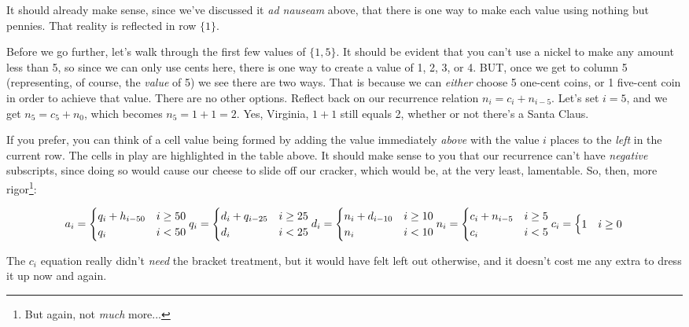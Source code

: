\vspace{2em}
It should already make sense, since we've discussed it \textit{ad nauseam} above, that there is one way to make each value using nothing but pennies.  That reality is reflected in row $\{1\}$.

Before we go further, let's walk through the first few values of $\{1,5\}$.  It should be evident that you can't use a nickel to make any amount less than 5\textcent, so since we can only use cents here, there is one way to create a value of 1\textcent, 2\textcent, 3\textcent, or 4\textcent.  BUT, once we get to column 5 (representing, of course, the \textit{value} of 5) we see there are two ways.  That is because we can \textit{either} choose 5 one-cent coins, or 1 five-cent coin in order to achieve that value.  There are no other options.  Reflect back on our recurrence relation $n_i = c_i + n_{i-5}$.  Let's set $i = 5$, and we get $n_5 = c_5 + n_0$, which becomes $n_5 = 1 + 1 = 2$.  Yes, Virginia, $1+1$ still equals 2, whether or not there's a Santa Claus.

If you prefer, you can think of a cell value being formed by adding the value immediately \textit{above} with the value $i$ places to the \textit{left} in the current row.  The cells in play are highlighted in the table above. It should make sense to you that our recurrence can't have \textit{negative} subscripts, since doing so would cause our cheese to slide off our cracker, which would be, at the very least, lamentable.  So, then, more rigor\footnote{But again, not \textit{much} more...}:

\begin{center}
\[
  a_i = \begin{cases}
      q_i + h_{i-50} & i \ge 50 \\
      q_i & i < 50
  \end{cases}

  q_i = \begin{cases}
    d_i + q_{i-25} & i \ge 25 \\
    d_i & i < 25
  \end{cases} \\[1em]
  
  d_i = \begin{cases}
    n_i + d_{i-10} & i \ge 10 \\
    n_i & i < 10
  \end{cases} \\[1em]
  
  n_i = \begin{cases}
      c_i + n_{i-5} & i \ge 5 \\
      c_i & i < 5
  \end{cases} \\[1em]

  c_i = \begin{cases}
    1 & i \ge 0
  \end{cases}
\]
\end{center}
The $c_i$ equation really didn't \textit{need} the bracket treatment, but it would have felt left out otherwise, and it doesn't cost me any extra to dress it up now and again.
\\

